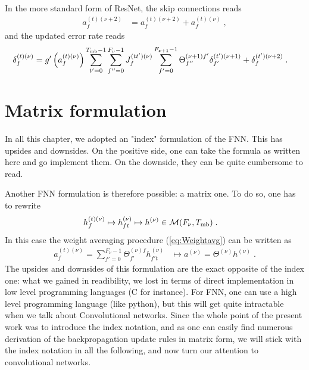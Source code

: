 \begin{subappendices}
In the more standard form of ResNet, the skip connections reads
\begin{align}
 a_{f}^{(t)(\nu+2)}&= a_{f}^{(t)(\nu+2)}+ a_{f}^{(t)(\nu)}\;,
\end{align}
and the updated error rate reads
\begin{align}
\delta^{(t)(\nu)}_f&=g'\left(a_{f}^{(t)(\nu)}\right)
%
\sum_{t'=0}^{T_{{\rm mb}}-1}\sum^{F_{\nu}-1}_{f''=0}J^{(tt')(\nu)}_{f}
%
\sum_{f'=0}^{F_{\nu+1}-1}\Theta^{(\nu+1)f'}_{f''}\delta^{(t')(\nu+1)}_{f'}+\delta^{(t')(\nu+2)}_{f}\;.
\end{align}


\section{Matrix formulation}

In all this chapter, we adopted an "index" formulation of the FNN. This has upsides and downsides. On the positive side, one can take the formula as written here and go implement them. On the downside, they can be quite cumbersome to read. 

\vspace{0.2cm}

Another FNN formulation is therefore possible: a matrix one. To do so, one has to rewrite
\begin{align}
h_f^{(t)(\nu)}\mapsto h^{(\nu)}_{ft}&\mapsto h^{(\nu)}\in \mathcal{M}(F_\nu,T_{\rm mb})\;.
\end{align}
In this case the weight averaging procedure (\ref{eq:Weightavg}) can be written as
\begin{align}
a_f^{(t)(\nu)}=\sum_{f'=0}^{F_\nu-1}\Theta^{(\nu)f}_{f'}h^{(\nu)}_{f't}&\mapsto a^{(\nu)}=\Theta^{(\nu)}h^{(\nu)}\;.
\end{align}
The upsides and downsides of this formulation are the exact opposite of the index one: what we gained in readibility, we lost in terms of direct implementation in low level programming languages (C for instance). For FNN, one can use a high level programming language (like python), but this will get quite intractable when we talk about Convolutional networks. Since the whole point of the present work was to introduce the index notation, and as one can easily find numerous derivation of the backpropagation update rules in matrix form, we will stick with the index notation in all the following, and now turn our attention to convolutional networks.
\end{subappendices}
